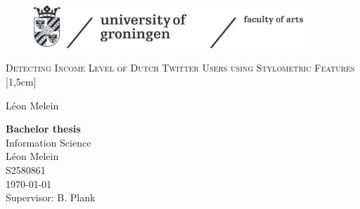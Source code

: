 \documentclass[
10pt, %
a4paper, %
oneside, %
headinclude,footinclude, %
] {book}%
\title{\normalfont\spacedallcaps{title}} %
\author{\spacedlowsmallcaps{author}} %
\date{} %
\begin{document}


\pagestyle{scrheadings} %



\hypersetup{pageanchor=false}
\begin{titlepage}
\thispagestyle{empty}
\begin{figure}[h!] %
\includegraphics[width=4in]{ruglogo} 
\end{figure}

\begin{center}
\vspace{30 mm}
\begingroup \linespread{1,75} \selectfont 
\textsc{\LARGE Detecting Income Level of Dutch Twitter Users using Stylometric Features}\\
[1,5cm]
\endgroup

L\'eon Melein\\[2,5cm]

\end{center}
\vfill
\textbf{Bachelor thesis}\\  %
Information Science\\  %
L\'eon Melein\\
S2580861\\
\today\\
Supervisor: B. Plank
\end{titlepage}
\hypersetup{pageanchor=true}
\end{document}

